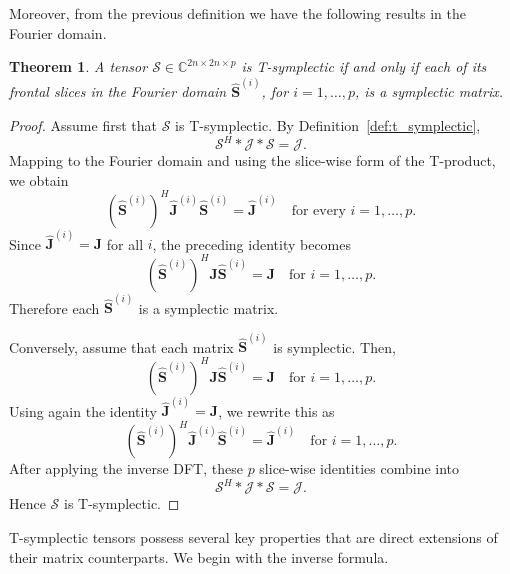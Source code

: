 \documentclass[pdflatex,sn-mathphys-ay]{sn-jnl}
\newcommand{\T}[1]{\mathcal{#1}}    %
\newcommand{\M}[1]{\bm{#1}}     %
\newcommand{\C}{\mathbb{C}}         %
\theoremstyle{thmstyleone}
\newtheorem{theorem}{Theorem}[section]
\theoremstyle{thmstyletwo}
\theoremstyle{thmstylethree}
\numberwithin{equation}{section}
\begin{document}
Moreover, from the previous definition we have the following results in the Fourier domain.

\begin{theorem}
\label{thm:symplectic_equiv}
A tensor $\T{S} \in \C^{2n \times 2n \times p}$ is T-symplectic if and only if each of its frontal slices in the Fourier domain $\widehat{\M{S}}^{(i)}$, for $i=1, \dots, p$, is a symplectic matrix.
\end{theorem}
\begin{proof}
Assume first that $\T{S}$ is T-symplectic. By Definition~\ref{def:t_symplectic},
$$
\T{S}^H * \T{J} * \T{S} = \T{J}.
$$
Mapping to the Fourier domain and using the slice-wise form of the T-product, we obtain
$$
(\widehat{\M{S}}^{(i)})^H \widehat{\M{J}}^{(i)} \widehat{\M{S}}^{(i)} = \widehat{\M{J}}^{(i)}
\quad \text{for every } i=1,\dots,p.
$$
Since $\widehat{\M{J}}^{(i)} = \M{J}$ for all $i$, the preceding identity becomes
$$
(\widehat{\M{S}}^{(i)})^H \M{J} \widehat{\M{S}}^{(i)} = \M{J}
\quad \text{for } i=1,\dots,p.
$$
Therefore each $\widehat{\M{S}}^{(i)}$ is a symplectic matrix.

Conversely, assume that each matrix $\widehat{\M{S}}^{(i)}$ is symplectic. Then,
$$
(\widehat{\M{S}}^{(i)})^H \M{J} \widehat{\M{S}}^{(i)} = \M{J}
\quad \text{for } i=1,\dots,p.
$$
Using again the identity $\widehat{\M{J}}^{(i)} = \M{J}$, we rewrite this as
$$
(\widehat{\M{S}}^{(i)})^H \widehat{\M{J}}^{(i)} \widehat{\M{S}}^{(i)} = \widehat{\M{J}}^{(i)}
\quad \text{for } i=1,\dots,p.
$$
After applying the inverse DFT, these $p$ slice-wise identities combine into
$$
\T{S}^H * \T{J} * \T{S} = \T{J}.
$$
Hence $\T{S}$ is T-symplectic.
\end{proof}

T-symplectic tensors possess several key properties that are direct extensions of their matrix counterparts. 
We begin with the inverse formula.
\end{document}
